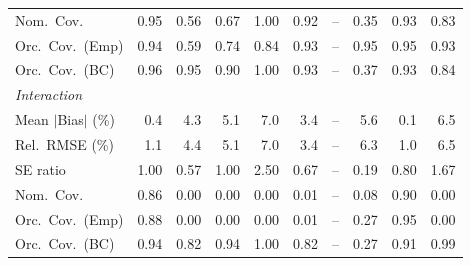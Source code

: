 \begin{table}[!htbp]
{\begin{tabular}{lrrrrrrrrr}
\quad Nom.\ Cov. & \cellcolor{rankone}0.95 & 0.56 & 0.67 & 1.00 & \cellcolor{rankthree}0.92 & -- & 0.35 & \cellcolor{ranktwo}0.93 & 0.83 \\
\quad Orc.\ Cov.\ (Emp) & \cellcolor{rankthree}0.94 & 0.59 & 0.74 & 0.84 & 0.93 & -- & \cellcolor{ranktwo}0.95 & \cellcolor{rankone}0.95 & 0.93 \\
\quad Orc.\ Cov.\ (BC) & \cellcolor{ranktwo}0.96 & \cellcolor{rankone}0.95 & 0.90 & 1.00 & 0.93 & -- & 0.37 & \cellcolor{rankthree}0.93 & 0.84 \\
\midrule
\multicolumn{10}{l}{\textit{Interaction}} \\[2pt]
\quad Mean $|$Bias$|$ (\%) & \cellcolor{ranktwo}0.4 & 4.3 & 5.1 & 7.0 & \cellcolor{rankthree}3.4 & -- & 5.6 & \cellcolor{rankone}0.1 & 6.5 \\
\quad Rel.\ RMSE (\%) & \cellcolor{ranktwo}1.1 & 4.4 & 5.1 & 7.0 & \cellcolor{rankthree}3.4 & -- & 6.3 & \cellcolor{rankone}1.0 & 6.5 \\
\quad SE ratio & \cellcolor{rankone}1.00 & 0.57 & \cellcolor{ranktwo}1.00 & 2.50 & 0.67 & -- & 0.19 & \cellcolor{rankthree}0.80 & 1.67 \\
\quad Nom.\ Cov. & \cellcolor{ranktwo}0.86 & 0.00 & 0.00 & 0.00 & 0.01 & -- & \cellcolor{rankthree}0.08 & \cellcolor{rankone}0.90 & 0.00 \\
\quad Orc.\ Cov.\ (Emp) & \cellcolor{ranktwo}0.88 & 0.00 & 0.00 & 0.00 & 0.01 & -- & \cellcolor{rankthree}0.27 & \cellcolor{rankone}0.95 & 0.00 \\
\quad Orc.\ Cov.\ (BC) & \cellcolor{rankone}0.94 & 0.82 & \cellcolor{ranktwo}0.94 & 1.00 & 0.82 & -- & 0.27 & 0.91 & \cellcolor{rankthree}0.99 \\
\bottomrule
\end{tabular}}
\end{table}

